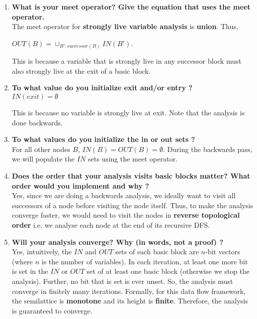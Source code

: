 \begin{enumerate}
\item \textbf{What is your meet operator? Give the equation that uses the meet operator.} \\

  The meet operator for \textbf{strongly live variable analysis} is \textbf{union}. Thus,

  $OUT(B) = \cup_{B' : successor(B)} IN(B')$.

  This is because a variable that is strongly live in any successor block must also strongly live at the exit of a basic block. 

\item \textbf{To what value do you initialize exit and/or entry ?} \\

  $IN(exit) = \emptyset$

  This is because no variable is strongly live at exit. Note that the analysis is done backwards.

\item \textbf{To what values do you initialize the in or out sets ?} \\

  For all other nodes $B$, $IN(B) = OUT(B) = \emptyset$. During the backwards pass, we will populate the $IN$ sets
  using the meet operator.

\item \textbf{Does the order that your analysis visits basic blocks matter? What order would you implement and why ?} \\

  Yes, since we are doing a backwards analysis, we ideally want to visit all successors of a node before visiting the node itself.
  Thus, to make the analysis converge faster, we would need to visit the nodes in \textbf{reverse topological order} i.e. we analyse each node
  at the end of its recursive DFS.

\item \textbf{Will your analysis converge? Why (in words, not a proof) ?} \\

  Yes, intuitively, the $IN$ and $OUT$ sets of each basic block are $n$-bit vectors (where $n$ is the number of variables).
  In each iteration, at least one more bit is set in the $IN$ or $OUT$ set of at least one basic block (otherwise we stop the analysis).
  Further, no bit that is set is ever unset.
  So, the analysis must converge in finitely many iterations.
  Formally, for this data flow framework, the semilattice is \textbf{monotone} and its height is \textbf{finite}.
  Therefore, the analysis is guaranteed to converge.


\end{enumerate}
